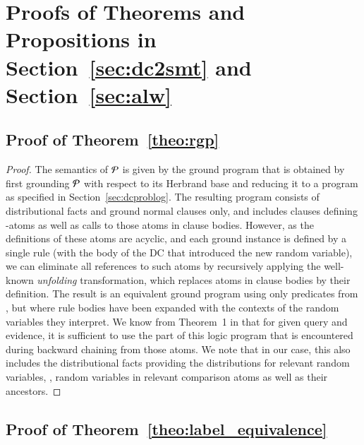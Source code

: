 \section{Proofs of Theorems and Propositions in Section~\ref{sec:dc2smt} and Section~\ref{sec:alw}}
\label{app:transformation_proofs}

\subsection{Proof of Theorem~\ref{theo:rgp}} \label{app:proof:rgp}


\theorgp*

\begin{proof}
    The semantics of $\mathcal{P}$ is given by the ground program that is obtained by first grounding $\mathcal{P}$ with respect to its Herbrand base and reducing it to a \dfplpsty program as specified in Section~\ref{sec:dcproblog}. The resulting program consists of distributional facts and ground normal clauses only, and includes clauses defining -atoms as well as calls to those atoms in clause bodies. However, as the definitions of these atoms are acyclic, and each ground instance is defined by a single rule (with the body of the DC that introduced the new random variable), we can eliminate all references to such atoms by recursively applying the well-known \emph{unfolding} transformation, which replaces atoms in clause bodies by their definition. The result is an equivalent ground program using only predicates from \dcpprogram, but where rule bodies have been expanded with the contexts of the random variables they interpret. We know from Theorem~1 in \citep{fierens2015inference} that for given query and evidence, it is sufficient to use the part of this logic program that is encountered during backward chaining from those atoms. We note that in our case, this also includes the distributional facts providing the distributions for relevant random variables, \ie, random variables in relevant comparison atoms as well as their ancestors.
\end{proof}




\subsection{Proof of Theorem~\ref{theo:label_equivalence}}
\label{app:proof:label_equivalence}


